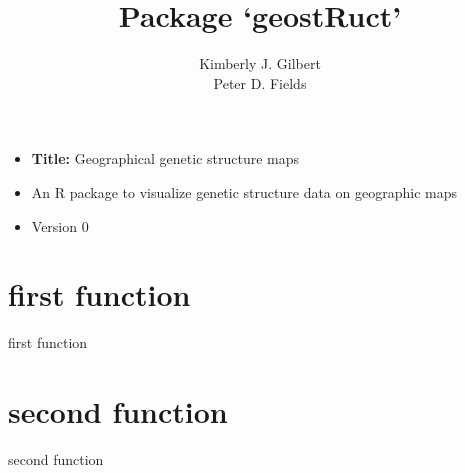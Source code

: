 \documentclass[12pt]{article}
\author{Kimberly J. Gilbert\\
\large{Peter D. Fields}
}
\title{Package `geostRuct'}
\begin{document}
\maketitle


\section*{}


\begin{itemize}
\item[] \textbf{Title:} Geographical genetic structure maps
\item[] An R package to visualize genetic structure data on geographic maps
\item[] Version 0

\end{itemize}



\section*{first function}  

first function

\section*{second function}  

second function



\end{document}
